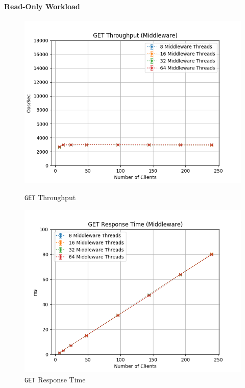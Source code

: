 \documentclass[11pt,a4paper]{article}
\begin{document}
\paragraph{Read-Only Workload}
%
\begin{figure}[H]
	\centering
	\captionsetup{width=0.4\textwidth}
    \begin{minipage}{0.5\textwidth}
        \centering
        \includegraphics[width=\textwidth]{../illustrations/plots/2_2_two_middlewares/0-1/middleware_get_tp_s.png}
        \caption{\texttt{GET} Throughput}
        \label{fig:two_middlewares_get_tp_mw}
    \end{minipage}\hfill
    \begin{minipage}{0.5\textwidth}
        \centering
        \includegraphics[width=\textwidth]{../illustrations/plots/2_2_two_middlewares/0-1/middleware_get_rt_ms.png}
        \caption{\texttt{GET} Response Time}
        \label{fig:two_middlewares_get_rt_mw}
    \end{minipage}
\end{figure}
\end{document}
